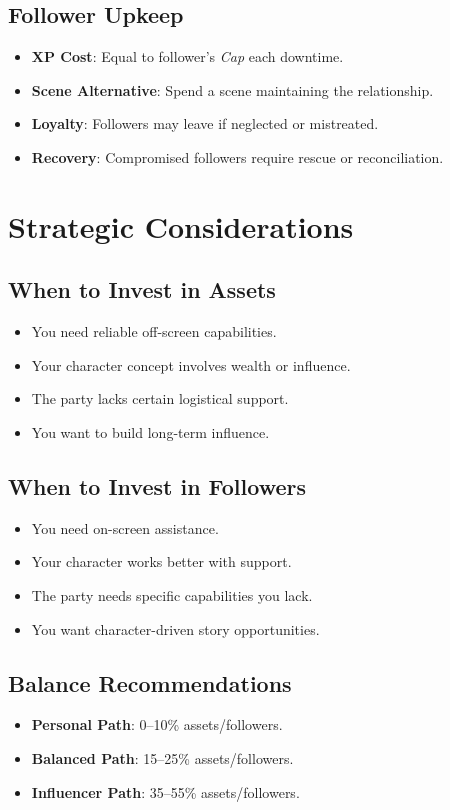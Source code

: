 \begin{multicols}{2}
\subsection*{Follower Upkeep}
\begin{itemize}
\item \textbf{XP Cost}: Equal to follower's \emph{Cap} each downtime.
\item \textbf{Scene Alternative}: Spend a scene maintaining the relationship.
\item \textbf{Loyalty}: Followers may leave if neglected or mistreated.
\item \textbf{Recovery}: Compromised followers require rescue or reconciliation.
\end{itemize}

\section{Strategic Considerations}

\subsection*{When to Invest in Assets}
\begin{itemize}
\item You need reliable off-screen capabilities.
\item Your character concept involves wealth or influence.
\item The party lacks certain logistical support.
\item You want to build long-term influence.
\end{itemize}

\subsection*{When to Invest in Followers}
\begin{itemize}
\item You need on-screen assistance.
\item Your character works better with support.
\item The party needs specific capabilities you lack.
\item You want character-driven story opportunities.
\end{itemize}

\subsection*{Balance Recommendations}
\begin{itemize}
\item \textbf{Personal Path}: 0--10\% assets/followers.
\item \textbf{Balanced Path}: 15--25\% assets/followers.
\item \textbf{Influencer Path}: 35--55\% assets/followers.
\end{itemize}


\end{multicols}
